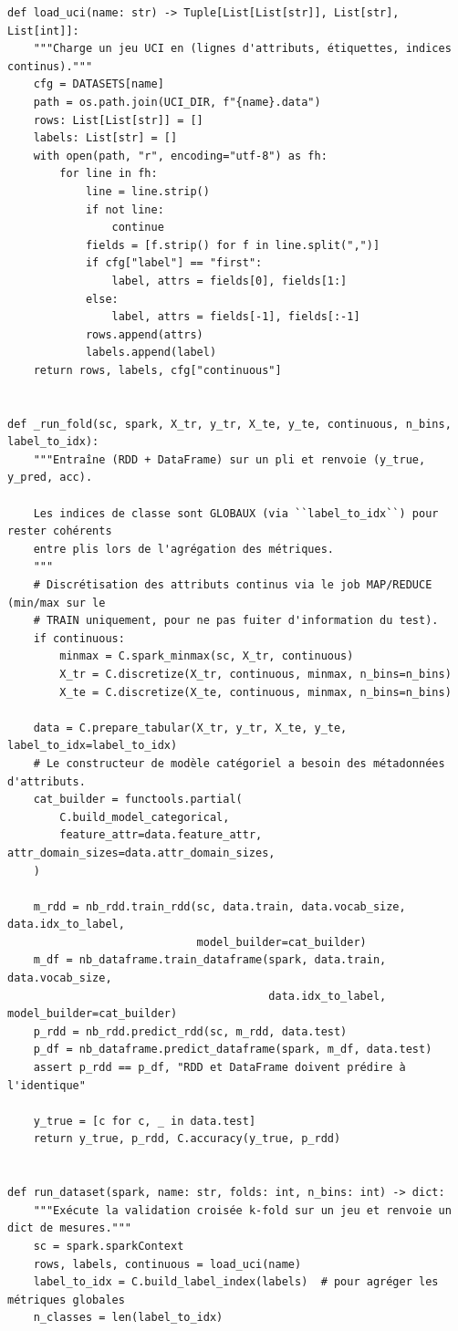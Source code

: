 \begin{lstlisting}[style=py]
def load_uci(name: str) -> Tuple[List[List[str]], List[str], List[int]]:
    """Charge un jeu UCI en (lignes d'attributs, étiquettes, indices continus)."""
    cfg = DATASETS[name]
    path = os.path.join(UCI_DIR, f"{name}.data")
    rows: List[List[str]] = []
    labels: List[str] = []
    with open(path, "r", encoding="utf-8") as fh:
        for line in fh:
            line = line.strip()
            if not line:
                continue
            fields = [f.strip() for f in line.split(",")]
            if cfg["label"] == "first":
                label, attrs = fields[0], fields[1:]
            else:
                label, attrs = fields[-1], fields[:-1]
            rows.append(attrs)
            labels.append(label)
    return rows, labels, cfg["continuous"]


def _run_fold(sc, spark, X_tr, y_tr, X_te, y_te, continuous, n_bins, label_to_idx):
    """Entraîne (RDD + DataFrame) sur un pli et renvoie (y_true, y_pred, acc).

    Les indices de classe sont GLOBAUX (via ``label_to_idx``) pour rester cohérents
    entre plis lors de l'agrégation des métriques.
    """
    # Discrétisation des attributs continus via le job MAP/REDUCE (min/max sur le
    # TRAIN uniquement, pour ne pas fuiter d'information du test).
    if continuous:
        minmax = C.spark_minmax(sc, X_tr, continuous)
        X_tr = C.discretize(X_tr, continuous, minmax, n_bins=n_bins)
        X_te = C.discretize(X_te, continuous, minmax, n_bins=n_bins)

    data = C.prepare_tabular(X_tr, y_tr, X_te, y_te, label_to_idx=label_to_idx)
    # Le constructeur de modèle catégoriel a besoin des métadonnées d'attributs.
    cat_builder = functools.partial(
        C.build_model_categorical,
        feature_attr=data.feature_attr, attr_domain_sizes=data.attr_domain_sizes,
    )

    m_rdd = nb_rdd.train_rdd(sc, data.train, data.vocab_size, data.idx_to_label,
                             model_builder=cat_builder)
    m_df = nb_dataframe.train_dataframe(spark, data.train, data.vocab_size,
                                        data.idx_to_label, model_builder=cat_builder)
    p_rdd = nb_rdd.predict_rdd(sc, m_rdd, data.test)
    p_df = nb_dataframe.predict_dataframe(spark, m_df, data.test)
    assert p_rdd == p_df, "RDD et DataFrame doivent prédire à l'identique"

    y_true = [c for c, _ in data.test]
    return y_true, p_rdd, C.accuracy(y_true, p_rdd)


def run_dataset(spark, name: str, folds: int, n_bins: int) -> dict:
    """Exécute la validation croisée k-fold sur un jeu et renvoie un dict de mesures."""
    sc = spark.sparkContext
    rows, labels, continuous = load_uci(name)
    label_to_idx = C.build_label_index(labels)  # pour agréger les métriques globales
    n_classes = len(label_to_idx)


\end{lstlisting}
